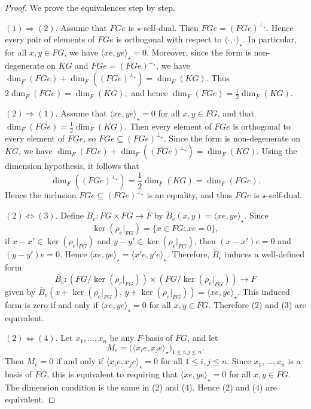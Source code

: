 \documentclass[11pt]{article}
\begin{document}
\begin{proof}
We prove the equivalences step by step.

\noindent
$(1)\Rightarrow(2)$. Assume that $FGe$ is $\star$-self-dual. Then $FGe=(FGe)^{\perp_\star}$. Hence every pair of elements of $FGe$ is orthogonal with respect to $\langle\cdot,\cdot\rangle_\star$. In particular, for all $x,y\in FG$, we have $\langle xe,ye\rangle_\star=0$. Moreover, since the form is non-degenerate on $KG$ and $FGe=(FGe)^{\perp_\star}$, we have
$
\dim_F(FGe)+\dim_F((FGe)^{\perp_\star})=\dim_F(KG).
$
Thus
$
2\dim_F(FGe)=\dim_F(KG),
$
and hence
$
\dim_F(FGe)=\frac{1}{2}\dim_F(KG).
$

\noindent
$(2)\Rightarrow(1)$. Assume that $\langle xe,ye\rangle_\star=0$ for all $x,y\in FG$, and that $\dim_F(FGe)=\frac{1}{2}\dim_F(KG)$. Then every element of $FGe$ is orthogonal to every element of $FGe$, so
$
FGe\subseteq (FGe)^{\perp_\star}.
$
Since the form is non-degenerate on $KG$, we have
$
\dim_F(FGe)+\dim_F((FGe)^{\perp_\star})=\dim_F(KG).
$
Using the dimension hypothesis, it follows that
$$
\dim_F((FGe)^{\perp_\star})=\frac{1}{2}\dim_F(KG)=\dim_F(FGe).
$$
Hence the inclusion $FGe\subseteq (FGe)^{\perp_\star}$ is an equality, and thus $FGe$ is $\star$-self-dual.

\noindent
$(2)\Leftrightarrow(3)$. Define $\widetilde{B}_e:FG\times FG\longrightarrow F$ by $\widetilde{B}_e(x,y)=\langle xe,ye\rangle_\star$. Since $$\ker(\rho_e|_{FG})=\{x\in FG:xe=0\},$$ if $x-x'\in\ker(\rho_e|_{FG})$ and $y-y'\in\ker(\rho_e|_{FG})$, then $(x-x')e=0$ and $(y-y')e=0$. Hence
$
\langle xe,ye\rangle_\star=\langle x'e,y'e\rangle_\star.
$
Therefore, $\widetilde{B}_e$ induces a well-defined form $$\overline{B}_e:(FG/\ker(\rho_e|_{FG}))\times (FG/\ker(\rho_e|_{FG}))\longrightarrow F$$ given by $\overline{B}_e(x+\ker(\rho_e|_{FG}),\,y+\ker(\rho_e|_{FG}))=\langle xe,ye\rangle_\star$. This induced form is zero if and only if
$
\langle xe,ye\rangle_\star=0
$
for all $x,y\in FG$. Therefore (2) and (3) are equivalent.

\noindent
$(2)\Leftrightarrow(4)$. Let $x_1,\dots,x_n$ be any $F$-basis of $FG$, and let
$$
M_e=\bigl(\langle x_i e,x_j e\rangle_\star\bigr)_{1\le i,j\le n}.
$$
Then $M_e=0$ if and only if $\langle x_i e,x_j e\rangle_\star=0$ for all $1\le i,j\le n$. Since $x_1,\dots,x_n$ is a basis of $FG$, this is equivalent to requiring that $\langle xe,ye\rangle_\star=0$ for all $x,y\in FG$. The dimension condition is the same in (2) and (4). Hence (2) and (4) are equivalent.
\end{proof}
\end{document}
